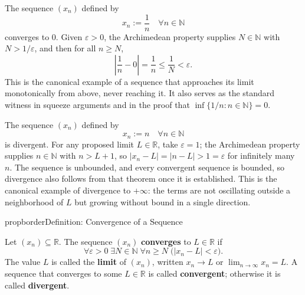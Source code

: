\begin{example}
\label{ex:sequence-reciprocal}

The sequence $(x_n)$ defined by
\[
    x_n := \frac{1}{n} \quad \forall n \in \mathbb{N}
\]
converges to $0$. Given $\varepsilon > 0$, the Archimedean property
supplies $N \in \mathbb{N}$ with $N > 1/\varepsilon$, and then for all
$n \ge N$,
\[
    \left|\frac{1}{n} - 0\right| = \frac{1}{n} \le \frac{1}{N} < \varepsilon.
\]
This is the canonical example of a sequence that approaches its limit
monotonically from above, never reaching it. It also serves as the
standard witness in squeeze arguments and in the proof that
$\inf\{1/n : n \in \mathbb{N}\} = 0$.
\end{example}

\begin{example}
\label{ex:sequence-natural}

The sequence $(x_n)$ defined by
\[
    x_n := n \quad \forall n \in \mathbb{N}
\]
is divergent. For any proposed limit $L \in \mathbb{R}$, take
$\varepsilon = 1$; the Archimedean property supplies $n \in \mathbb{N}$
with $n > L + 1$, so $|x_n - L| = |n - L| > 1 = \varepsilon$ for
infinitely many $n$. The sequence is unbounded, and every convergent
sequence is bounded, so divergence also follows from that theorem once
it is established. This is the canonical example of divergence to
$+\infty$: the terms are not oscillating outside a neighborhood of $L$
but growing without bound in a single direction.
\end{example}




































\begin{bpnew}{propborder}{Definition: Convergence of a Sequence}
\begin{definition}
\label{def:convergent-sequence}

Let $(x_n) \subseteq \mathbb{R}$. The sequence $(x_n)$ \textbf{converges}
to $L \in \mathbb{R}$ if
\[
    \forall \varepsilon > 0 \;\exists N \in \mathbb{N} \;\forall n \ge N
    \;\bigl(|x_n - L| < \varepsilon\bigr).
\]
The value $L$ is called the \textbf{limit} of $(x_n)$, written
$x_n \to L$ or $\displaystyle\lim_{n \to \infty} x_n = L$.
A sequence that converges to some $L \in \mathbb{R}$ is called
\textbf{convergent}; otherwise it is called \textbf{divergent}.
\end{definition}
\end{bpnew}

